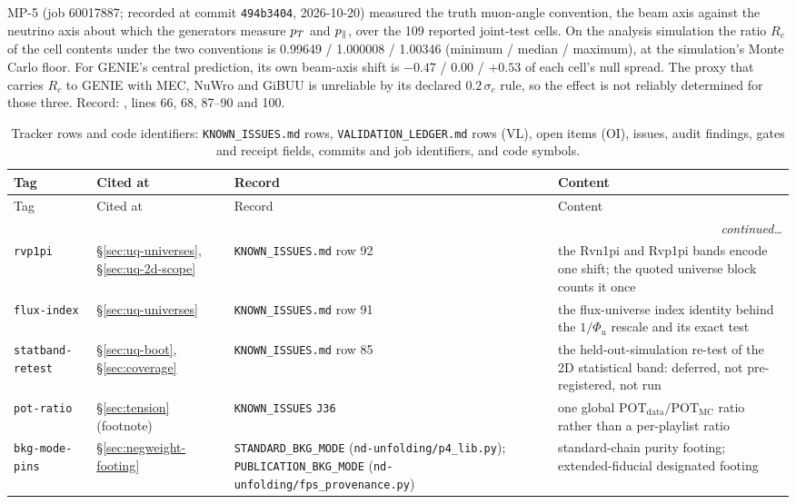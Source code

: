 \begin{description}[leftmargin=0pt,itemsep=3pt]
  \item[\texttt{mp5-truth-axis}.] MP-5 (job 60017887; recorded at commit \texttt{494b3404}, 2026-10-20) measured the truth muon-angle convention, the beam axis against the neutrino axis about which the generators measure $p_{T}$ and $p_{\parallel}$, over the 109 reported joint-test cells. On the analysis simulation the ratio $R_c$ of the cell contents under the two conventions is 0.99649 / 1.000008 / 1.00346 (minimum / median / maximum), at the simulation's Monte Carlo floor. For GENIE's central prediction, its own beam-axis shift is $-0.47$ / $0.00$ / $+0.53$ of each cell's null spread. The proxy that carries $R_c$ to GENIE with MEC, NuWro and GiBUU is unreliable by its declared $0.2\,\sigma_c$ rule, so the effect is not reliably determined for those three. Record: , lines 66, 68, 87--90 and 100.
\end{description}

{\small
\begin{longtable}{@{}llp{}p{}@{}}
\caption{Tracker rows and code identifiers: \texttt{KNOWN\_ISSUES.md} rows,
\texttt{VALIDATION\_LEDGER.md} rows (VL), open items (OI), issues, audit findings,
gates and receipt fields, commits and job identifiers, and code symbols.}\label{tab:prov-trackers}\\
\toprule
Tag & Cited at & Record & Content \\
\midrule
\endfirsthead
\toprule
Tag & Cited at & Record & Content \\
\midrule
\endhead
\midrule \multicolumn{4}{r}{\emph{continued\ldots}}\\ \endfoot
\bottomrule
\endlastfoot
\texttt{rvp1pi} & \S\ref{sec:uq-universes}, \S\ref{sec:uq-2d-scope} &
  \texttt{KNOWN\_ISSUES.md} row 92 &
  the Rvn1pi and Rvp1pi bands encode one shift; the quoted universe block counts it once \\
\texttt{flux-index} & \S\ref{sec:uq-universes} &
  \texttt{KNOWN\_ISSUES.md} row 91 &
  the flux-universe index identity behind the $1/\Phi_{u}$ rescale and its exact test \\
\texttt{statband-retest} & \S\ref{sec:uq-boot}, \S\ref{sec:coverage} &
  \texttt{KNOWN\_ISSUES.md} row 85 &
  the held-out-simulation re-test of the 2D statistical band: deferred, not pre-registered, not run \\
\texttt{pot-ratio} & \S\ref{sec:tension} (footnote) &
  \texttt{KNOWN\_ISSUES} \texttt{J36} &
  one global $\mathrm{POT}_{\mathrm{data}}/\mathrm{POT}_{\mathrm{MC}}$ ratio rather than a
  per-playlist ratio \\
\texttt{bkg-mode-pins} & \S\ref{sec:negweight-footing} &
  \texttt{STANDARD\_BKG\_MODE} (\texttt{nd-unfolding/p4\_lib.py});
  \texttt{PUBLICATION\_BKG\_MODE} (\texttt{nd-unfolding/}\allowbreak\texttt{fps\_provenance.py}) &
  standard-chain purity footing; extended-fiducial designated footing \\
\end{longtable}
}

